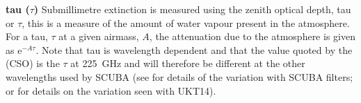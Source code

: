 \documentclass[twoside,11pt]{starlink}
\begin{document}
\begin{description}
\item{\textbf{tau ($\tau$)}} Submillimetre extinction is measured using the
zenith optical depth, tau or $\tau$, this is a measure of the amount of water
vapour present in the atmosphere. For a tau, $\tau$ at a given airmass, $A$,
the attenuation due to the atmosphere is given as e$^{-A \tau}$. Note that tau
is wavelength dependent and that the value quoted by the
 (CSO) is the $\tau$ at 225~GHz and will therefore be different at
the other wavelengths used by SCUBA (see \cite{ENA} for details of the
variation with SCUBA filters; or \cite{SR94} for details on the
variation seen with UKT14).

\end{description}
\end{document}
